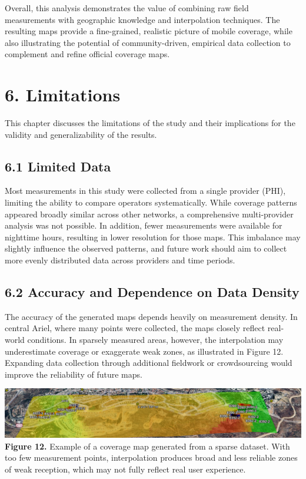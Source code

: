 \documentclass[11pt]{article}
\begin{document}
Overall, this analysis demonstrates the value of combining raw field
measurements with geographic knowledge and interpolation techniques. The
resulting maps provide a fine-grained, realistic picture of mobile
coverage, while also illustrating the potential of community-driven,
empirical data collection to complement and refine official coverage
maps.


\hypertarget{limitations}{%
\section{6. Limitations}\label{limitations}}

This chapter discusses the limitations of the study and their
implications for the validity and generalizability of the results.

\hypertarget{limited-data}{%
\subsection{6.1 Limited Data}\label{limited-data}}

Most measurements in this study were collected from a single provider
(PHI), limiting the ability to compare operators systematically. While
coverage patterns appeared broadly similar across other networks, a
comprehensive multi-provider analysis was not possible. In addition,
fewer measurements were available for nighttime hours, resulting in
lower resolution for those maps. This imbalance may slightly influence
the observed patterns, and future work should aim to collect more evenly
distributed data across providers and time periods.

\hypertarget{accuracy-and-dependence-on-data-density}{%
\subsection{6.2 Accuracy and Dependence on Data
Density}\label{accuracy-and-dependence-on-data-density}}

The accuracy of the generated maps depends heavily on measurement
density. In central Ariel, where many points were collected, the maps
closely reflect real-world conditions. In sparsely measured areas,
however, the interpolation may underestimate coverage or exaggerate weak
zones, as illustrated in Figure 12. Expanding data collection through
additional fieldwork or crowdsourcing would improve the reliability of
future maps.

\includegraphics[width=1.0\textwidth]{figures/media/image8.png}\\
\textbf{Figure 12.} Example of a coverage map generated from a sparse
dataset. With too few measurement points, interpolation produces broad
and less reliable zones of weak reception, which may not fully reflect
real user experience.
\end{document}
